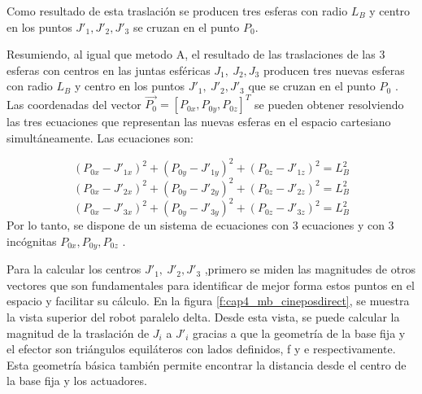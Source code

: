         Como resultado de esta traslación se producen tres esferas con radio $L_B$ y centro en los puntos $J'_1,J'_2,J'_3$  se cruzan en el punto $P_0$.




    \newpage


        
    Resumiendo, al igual que metodo A, el resultado de las traslaciones de las 3 esferas con centros en las juntas esféricas  \( J_{1},~J_{2},J_{3} \)  producen tres nuevas esferas con radio  \( L_{B} \)  y centro en los puntos  \( J'_{1},~J'_{2},J'_{3} \)   que se cruzan en el punto  \( P_{0} \) . Las coordenadas del vector  \( \overrightarrow{P_{0}}=  \left[ P_{0x},P_{0y},P_{0z} \right] ^{T} \)  se pueden obtener resolviendo las tres ecuaciones que representan las nuevas esferas en el espacio cartesiano simultáneamente. Las ecuaciones son:
    
        \begin{equation}
            \left( P_{0x}-J'_{1x} \right) ^{2}+ \left( P_{0y}-J'_{1y} \right) ^{2}+ \left( P_{0z}-J'_{1z} \right) ^{2}=L_{B}^{2}
        \label{eq:cap4_MB_21}
        \end{equation}
        \begin{equation}
            \left( P_{0x}-J'_{2x} \right) ^{2}+ \left( P_{0y}-J'_{2y} \right) ^{2}+ \left( P_{0z}-J'_{2z} \right) ^{2}=L_{B}^{2}
        \label{eq:cap4_MB_22}
        \end{equation}    
        \begin{equation}
            \left( P_{0x}-J'_{3x} \right) ^{2}+ \left( P_{0y}-J'_{3y} \right) ^{2}+ \left( P_{0z}-J'_{3z} \right) ^{2}=L_{B}^{2}
        \label{eq:cap4_MB_23}
        \end{equation}            
    Por lo tanto, se dispone de un sistema de ecuaciones con 3 ecuaciones y con 3 incógnitas \( P_{0x},P_{0y},P_{0z} \) .  
    
    Para la calcular los centros \( J'_{1},~J'_{2},J'_{3} \) ,primero se miden las magnitudes de otros vectores que son fundamentales para identificar de mejor forma estos puntos en el espacio y facilitar su cálculo. En la figura \ref{f:cap4_mb_cineposdirect}, se muestra la vista superior del robot paralelo delta. Desde esta vista, se puede calcular la magnitud de la traslación de  $J_i$ a  $J'_i$  gracias a que la geometría de la base fija y el efector son triángulos equiláteros con lados definidos, f y e respectivamente. Esta geometría básica también permite encontrar la distancia desde el centro de la base fija y los actuadores.
    
